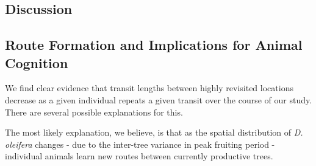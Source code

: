 \documentclass[twoside,12pt,final]{ucthesis-CA2012}
\begin{document}
\begin{ucmainmatter}
{\section{Discussion}\label{discussion-3}}

\hypertarget{route-formation-and-implications-for-animal-cognition}{%
\subsection{Route Formation and Implications for Animal Cognition}\label{route-formation-and-implications-for-animal-cognition}}

We find clear evidence that transit lengths between highly revisited locations decrease as a given individual repeats a given transit over the course of our study. There are several possible explanations for this.

The most likely explanation, we believe, is that as the spatial distribution of \emph{D. oleifera} changes - due to the inter-tree variance in peak fruiting period - individual animals learn new routes between currently productive trees.


\end{ucmainmatter}
\end{document}
